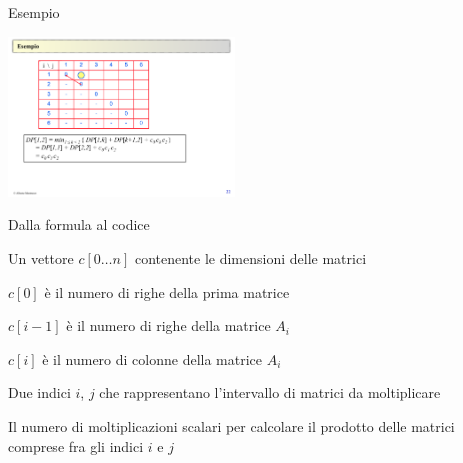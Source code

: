 \begin{frame}{Esempio}
\vspace{-12pt}
\begin{center}
\includegraphics[width=6cm,page=5]{moltmatrici.pdf}
\end{center}
\vspace{-3pt}
\end{frame}

\begin{frame}{Dalla formula al codice}

\vspace{-6pt}
\begin{myboxtitle}[Input]
\BIL
\item Un vettore $c[0 \ldots n]$ contenente le dimensioni delle matrici
\BI
\item $c[0]$ è il numero di righe della prima matrice
\item $c[i-1]$ è il numero di righe della matrice $A_i$
\item $c[i]$ è il numero di colonne della matrice $A_i$
\EI
\item Due indici $i$, $j$ che rappresentano l'intervallo di matrici da moltiplicare
\EIL
\end{myboxtitle}

\begin{myboxtitle}[Output]
Il numero di moltiplicazioni scalari per calcolare il prodotto delle matrici comprese fra gli indici $i$ e $j$
\end{myboxtitle}

\end{frame}

